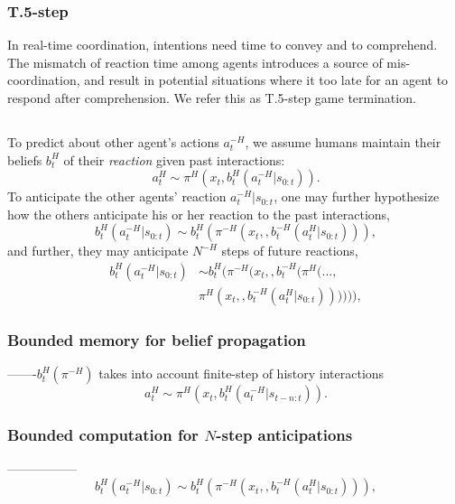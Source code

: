 \documentclass[letterpaper, 10 pt, conference]{ieeeconf}  %
\begin{document}
\subsubsection{T.5-step}
In real-time coordination, intentions need time to convey and to comprehend. The mismatch of reaction time among agents introduces a source of mis-coordination, and result in potential situations where it too late for an agent to respond after comprehension. We refer this as T.5-step game termination.


\subsection{}
To predict about other agent's actions $a^{-H}_t$, we assume humans maintain their beliefs $b^{H}_t$ of their \textit{reaction} given past interactions:
\begin{equation}~\label{eq:human_decision1}
a^H_t \sim \pi^H(x_t, b^H_t(a^{-H}_{t}|s_{0:t})).
\end{equation}
To anticipate the other agents' reaction $a^{-H}_{t}|s_{0:t}$, one may further hypothesize how the others anticipate his or her reaction to the past interactions, 
\begin{equation}~\label{eq:human_decision2}
b^H_t(a^{-H}_{t}|s_{0:t}) \sim  b^H_t(\pi^{-H} (x_t, ,b_{t}^{-H}(a^H_{t}|s_{0:t}))),
\end{equation}
and further, they may anticipate $N^{-H}$ steps of future reactions,   
\begin{align}~\label{eq:human_decisionN}
b^H_t(a^{-H}_{t}|s_{0:t})& \sim  b^H_t(\pi^{-H} (x_t, ,b_{t}^{-H}(\pi^H(...,\\
&\pi^H (x_{t},,b_{t}^{-H}(a^H_{t}|s_{0:t})))))),
\end{align}
\subsubsection{Bounded memory for belief propagation}
-------$b^H_{t}(\pi^{-H})$ takes into account finite-step of history interactions
\begin{equation}~\label{eq:human_decision1bounded}
a^H_t \sim \pi^H(x_t, b^H_t(a^{-H}_{t}|s_{t-n:t})).
\end{equation}
\subsubsection{Bounded computation for $N$-step anticipations}
-----------------
\begin{equation}~\label{eq:human_decision2bounded}
b^H_t(a^{-H}_{t}|s_{0:t}) \sim  b^H_t(\pi^{-H} (x_t, ,b_{t}^{-H}(a^H_{t}|s_{0:t}))),
\end{equation}
\end{document}
